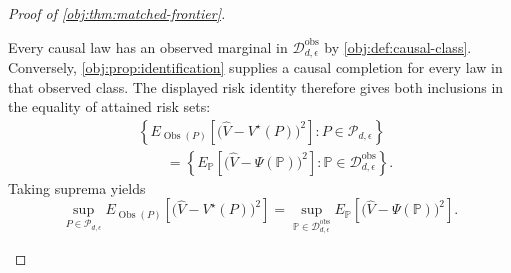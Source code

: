 \documentclass[11pt]{article}
\begin{document}
\begin{proof}[Proof of \cref{obj:thm:matched-frontier}]
\begin{enumerate}
Every causal law has an observed marginal in \(\mathcal D_{d,\epsilon}^{\mathrm{obs}}\) by \cref{obj:def:causal-class}. Conversely, \cref{obj:prop:identification} supplies a causal completion for every law in that observed class. The displayed risk identity therefore gives both inclusions in the equality of attained risk sets:
\[
\begin{aligned}
&\left\{
E_{\operatorname{Obs}(P)}\!\left[
\bigl(\widehat V-V^\star(P)\bigr)^2
\right]:
P\in\mathcal P_{d,\epsilon}
\right\}
\\
&\qquad=
\left\{
E_{\mathbb P}\!\left[
\bigl(\widehat V-\Psi(\mathbb P)\bigr)^2
\right]:
\mathbb P\in\mathcal D_{d,\epsilon}^{\mathrm{obs}}
\right\}.
\end{aligned}
\]
Taking suprema yields
\[
\sup_{P\in\mathcal P_{d,\epsilon}}
E_{\operatorname{Obs}(P)}\!\left[
\bigl(\widehat V-V^\star(P)\bigr)^2
\right]
=
\sup_{\mathbb P\in\mathcal D_{d,\epsilon}^{\mathrm{obs}}}
E_{\mathbb P}\!\left[
\bigl(\widehat V-\Psi(\mathbb P)\bigr)^2
\right].
\]


\end{enumerate}
\end{proof}
\end{document}
